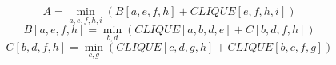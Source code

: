 \documentclass{article}
\begin{document}
$$ A =\min_{ a,e,f,h,i } \left( B\left[a,e,f,h\right]+CLIQUE\left[e,f,h,i\right]\right) $$
$$ B\left[ a,e,f,h \right] =\min_{ b,d } \left( CLIQUE\left[a,b,d,e\right]+C\left[b,d,f,h\right]\right) $$
$$ C\left[ b,d,f,h \right] =\min_{ c,g } \left( CLIQUE\left[c,d,g,h\right]+CLIQUE\left[b,c,f,g\right]\right) $$
\end{document}
